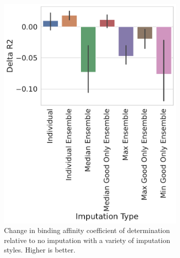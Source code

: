 \documentclass[journal=jcisd8,manuscript=article]{achemso}
\begin{document}
\begin{figure}[tbph]
    \centering
    \begin{subfigure}[t]{0.30\textwidth}
        \centering
        \includegraphics[width=\linewidth]{figures/ComparingImpStylesR2.pdf}
        \caption{Change in binding affinity coefficient of determination relative to no imputation with a variety of imputation styles. Higher is better.}
    \end{subfigure}
    \hfill
    \begin{subfigure}[t]{0.30\textwidth}
        \centering

\end{subfigure}
\end{figure}
\end{document}
